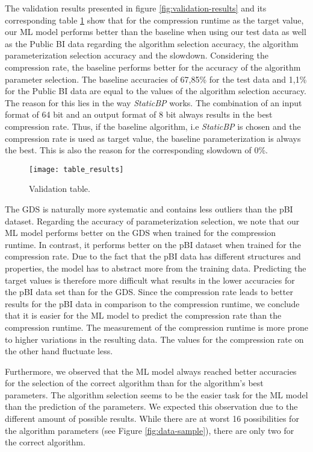 The validation results presented in figure \ref{fig:validation-results} and its corresponding table \ref{fig:val_tab} show that for the compression runtime as the target value, our ML model performs better than the baseline when using our test data as well as the Public BI data regarding the algorithm selection accuracy, the algorithm parameterization selection accuracy and the slowdown. Considering the compression rate, the baseline performs better for the accuracy of the algorithm parameter selection. The baseline accuracies of 67,85\% for the test data and 1,1\% for the Public BI data are equal to the values of the algorithm selection accuracy. The reason for this lies in the way \emph{StaticBP} works. The combination of an input format of 64 bit and an output format of 8 bit always results in the best compression rate. Thus, if the baseline algorithm, i.e \emph{StaticBP} is chosen and the compression rate is used as target value, the baseline parameterization is always the best. This is also the reason for the corresponding slowdown of 0\%.

\begin{figure}[h]
    \centering
    \texttt{[image: table\_results]}
    \caption{Validation table.}
    \label{fig:val_tab}
\end{figure}

The GDS is naturally more systematic and contains less outliers than the pBI dataset. Regarding the accuracy of parameterization selection, we note that our ML model performs better on the GDS when trained for the compression runtime. In contrast, it performs better on the pBI dataset when trained for the compression rate.
Due to the fact that the pBI data has different structures and properties, the model has to abstract more from the training data. Predicting the target values is therefore more difficult what results in the lower accuracies for the pBI data set than for the GDS.
Since the compression rate leads to better results for the pBI data in comparison to the compression runtime, we conclude that it is easier for the ML model to predict the compression rate than the compression runtime.
The measurement of the compression runtime is more prone to higher variations in the resulting data. The values for the compression rate on the other hand fluctuate less.

Furthermore, we observed that the ML model always reached better accuracies for the selection of the correct algorithm than for the algorithm's best parameters. The algorithm selection seems to be the easier task for the ML model than the prediction of the parameters. We expected this observation due to the different amount of possible results. While there are at worst 16 possibilities for the algorithm parameters (see Figure \ref{fig:data-sample}), there are only two for the correct algorithm.

